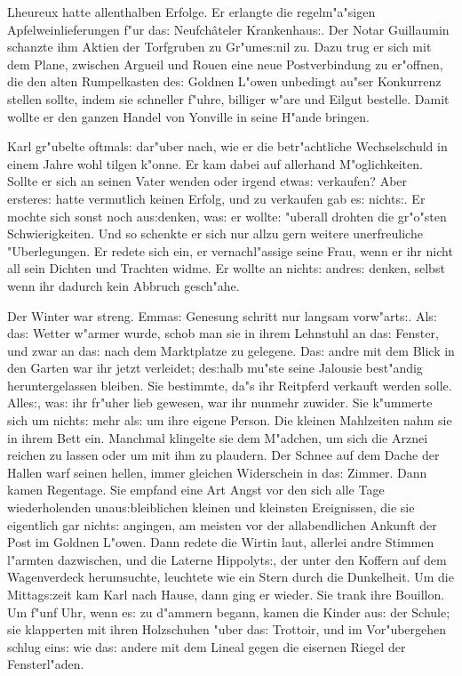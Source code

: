 \documentclass[oneside,12pt]{book}
\newcommand{\s}{s:}%
\begin{document}
Lheureux hatte allenthalben Erfolge. Er erlangte die
regelm"a"sigen Apfelweinlieferungen f"ur da{\s} Neufch\^ateler
Krankenhau{\s}. Der Notar Guillaumin schanzte ihm Aktien der
Torfgruben zu Gr"ume{\s}nil zu. Dazu trug er sich mit dem Plane,
zwischen Argueil und Rouen eine neue Postverbindung zu er"offnen,
die den alten Rumpelkasten de{\s} Goldnen L"owen unbedingt au"ser
Konkurrenz stellen sollte, indem sie schneller f"uhre, billiger
w"are und Eilgut bestelle. Damit wollte er den ganzen Handel von
Yonville in seine H"ande bringen.

Karl gr"ubelte oftmal{\s} dar"uber nach, wie er die betr"achtliche
Wechselschuld in einem Jahre wohl tilgen k"onne. Er kam dabei auf
allerhand M"oglichkeiten. Sollte er sich an seinen Vater wenden
oder irgend etwa{\s} verkaufen? Aber erstere{\s} hatte vermutlich
keinen Erfolg, und zu verkaufen gab e{\s} nicht{\s}. Er mochte
sich sonst noch au{\s}denken, wa{\s} er wollte: "uberall drohten
die gr"o"sten Schwierigkeiten. Und so schenkte er sich nur allzu
gern weitere unerfreuliche "Uberlegungen. Er redete sich ein, er
vernachl"assige seine Frau, wenn er ihr nicht all sein Dichten und
Trachten widme. Er wollte an nicht{\s} andre{\s} denken, selbst
wenn ihr dadurch kein Abbruch gesch"ahe.

Der Winter war streng. Emma{\s} Genesung schritt nur langsam
vorw"art{\s}. Al{\s} da{\s} Wetter w"armer wurde, schob man sie in
ihrem Lehnstuhl an da{\s} Fenster, und zwar an da{\s} nach dem
Marktplatze zu gelegene. Da{\s} andre mit dem Blick in den Garten
war ihr jetzt verleidet; de{\s}halb mu"ste seine Jalousie
best"andig heruntergelassen bleiben. Sie bestimmte, da"s ihr
Reitpferd verkauft werden solle. Alle{\s}, wa{\s} ihr fr"uher lieb
gewesen, war ihr nunmehr zuwider. Sie k"ummerte sich um nicht{\s}
mehr al{\s} um ihre eigene Person. Die kleinen Mahlzeiten nahm sie
in ihrem Bett ein. Manchmal klingelte sie dem M"adchen, um sich
die Arznei reichen zu lassen oder um mit ihm zu plaudern. Der
Schnee auf dem Dache der Hallen warf seinen hellen, immer gleichen
Widerschein in da{\s} Zimmer. Dann kamen Regentage. Sie empfand
eine Art Angst vor den sich alle Tage wiederholenden
unau{\s}bleiblichen kleinen und kleinsten Ereignissen, die sie
eigentlich gar nicht{\s} angingen, am meisten vor der
allabendlichen Ankunft der Post im Goldnen L"owen. Dann redete die
Wirtin laut, allerlei andre Stimmen l"armten dazwischen, und die
Laterne Hippolyt{\s}, der unter den Koffern auf dem Wagenverdeck
herumsuchte, leuchtete wie ein Stern durch die Dunkelheit. Um die
Mittag{\s}zeit kam Karl nach Hause, dann ging er wieder. Sie trank
ihre Bouillon. Um f"unf Uhr, wenn e{\s} zu d"ammern begann, kamen
die Kinder au{\s} der Schule; sie klapperten mit ihren Holzschuhen
"uber da{\s} Trottoir, und im Vor"ubergehen schlug ein{\s} wie
da{\s} andere mit dem Lineal gegen die eisernen Riegel der
Fensterl"aden.
\end{document}
